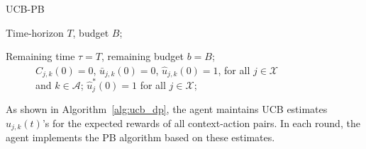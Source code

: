 \begin{algorithm}[htbp]
\caption{UCB-PB}
\label{alg:ucb_dp}
\begin{algorithmic}
 Time-horizon $T$, budget $B$;

 Remaining time $\tau = T$, remaining budget $b = B$; \\
~~~~~~$C_{j,k}(0) = 0$, $\bar{u}_{j,k}(0) = 0$, $\hat{u}_{j,k}(0) = 1$, for all $j \in \mathcal{X}$ \\
~~~~~~and $k\in \mathcal{A}$; $\hat{u}^*_{j}(0) = 1$ for all $j \in \mathcal{X}$;

\ENDIF
{}
\ENDFOR
\end{algorithmic}
\end{algorithm}

As shown in Algorithm~\ref{alg:ucb_dp}, the agent maintains UCB estimates $\hat{u}_{j,k}(t)$'s for the expected rewards of all context-action pairs. In each round, the agent implements the PB algorithm based on these estimates.



